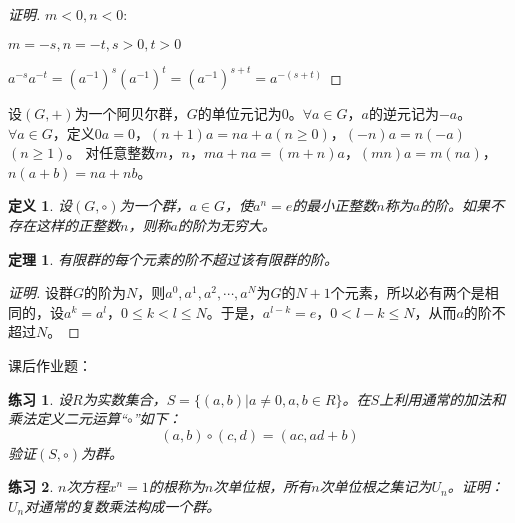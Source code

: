 \documentclass{article}
\newtheorem{Def}{定义}
\newtheorem{Thm}{定理}
\newtheorem{Exercise}{练习}
\begin{document}
\begin{CJK*}{UTF8}{gbsn}
\begin{proof}[证明]
  $m<0, n<0:$
  
  $m=-s,n=-t, s>0,t>0$
  
  $a^{-s}a^{-t}=(a^{-1})^s(a^{-1})^t=(a^{-1})^{s+t}=a^{-(s+t)}$
  \end{proof}
  设$(G,+)$为一个阿贝尔群，$G$的单位元记为$0$。$\forall a\in G$，$a$的逆元记为$-a$。$\forall a\in G$，定义$0a=0$，$(n+1)a=na+a$$(n\geq 0)$，$(-n)a=n(-a)$$(n\geq 1)$。
  对任意整数$m$，$n$，$ma+na=(m+n)a$，$(mn)a=m(na)$，$n(a+b)=na+nb$。
  \begin{Def}
    设$(G,\circ)$为一个群，$a\in G$，使$a^n=e$的最小正整数$n$称为$a$的阶。如果不存在这样的正整数$n$，则称$a$的阶为无穷大。
  \end{Def}
  \begin{Thm}
    有限群的每个元素的阶不超过该有限群的阶。
  \end{Thm}
  \begin{proof}[证明]
    设群$G$的阶为$N$，则$a^0,a^1,a^2,\cdots,a^N$为$G$的$N+1$个元素，所以必有两个是相同的，设$a^k=a^l$，$0\leq k<l\leq N$。于是，$a^{l-k}=e$，$0<l-k\leq N$，从而$a$的阶不超过$N$。
  \end{proof}

课后作业题：
\begin{Exercise}
  设$R$为实数集合，$S=\{(a,b)|a\neq 0,a,b\in R\}$。在$S$上利用通常的加法和乘法定义二元运算“$\circ$”如下：
  \[(a,b)\circ (c,d) = (ac, ad + b)\]
  验证$(S,\circ)$为群。
\end{Exercise}

\begin{Exercise}
  $n$次方程$x^n=1$的根称为$n$次单位根，所有$n$次单位根之集记为$U_n$。证明：$U_n$对通常的复数乘法构成一个群。
\end{Exercise}



\end{CJK*}
\end{document}
